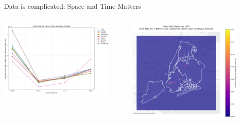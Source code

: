 \documentclass[aspectratio=169,xcolor={usenames,dvipsnames,svgnames,table},10pt,usepdftitle=false,hyperref={bookmarksdepth=3}]{beamer}
\makeatletter
\renewenvironment{figure}[1][]{%
  \def\@captype{figure}%
  \par\centering}
  {\par}
\makeatother
\begin{document}
\begin{frame}{Data is complicated: Space and Time Matters}
    \begin{columns}
        \begin{column}{0.57\textwidth}
            \begin{figure}
                \centering
                \includegraphics[width=0.9\textwidth]{../results/cellx800m_celly800m_cellt6h/plots/crash_risk_by_day_and_time_800.0m_800.0m_6.0h.png}
                \caption{Risk varies by day and time}
            \end{figure}
        \end{column}
        
        \begin{column}{0.43\textwidth}
            \begin{figure}
                \centering
                \includegraphics[width=0.9\textwidth]{../results/cellx800m_celly800m_cellt6h/plots/spatial_risk_heatmap_800.0m_800.0m_6.0h_filtered.png}
                \caption{Risk varies by location}
            \end{figure}
        \end{column}
    \end{columns}
    
    \vspace{0.3cm}
\end{frame}
\end{document}

